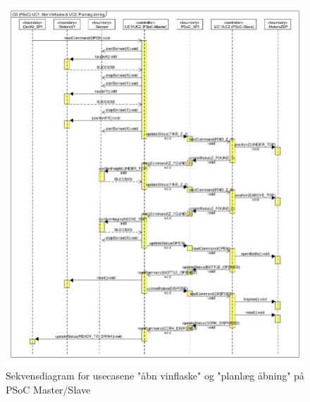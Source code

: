 \begin{figure}[H]
\includegraphics[scale=0.8]{Software/Sekvendiagram_PSoC}
\caption{Sekvensdiagram for usecasene "åbn vinflaske" og "planlæg åbning" på PSoC Master/Slave}
\end{figure}
